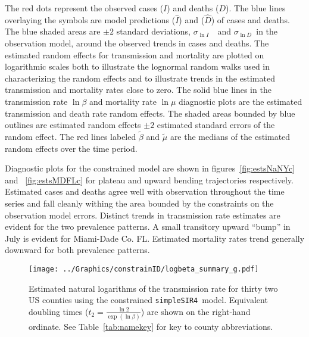 \documentclass[12pt,letterpaper]{article}
\newcommand\SSm{{\tt simpleSIR4}}
\newcommand\slI{$\sigma_{\ln I}$\ }
\newcommand\slD{$\sigma_{\ln D}$}
\begin{document}
\label{pp:diagexpl} 
The red dots represent the observed cases ($I$) and deaths ($D$).
The blue lines overlaying the symbols are model predictions ($\widehat{I}$)
and ($\widehat{D}$) of cases and deaths. 
The blue shaded areas are 
$\pm 2$ standard deviations, \slI\ and \slD\ in the
observation model, around the observed trends in cases and deaths.
The estimated random effects for transmission and mortality are plotted
on logarithmic scales both to illustrate the
lognormal random walks used in characterizing the random effects
and to illustrate trends in the estimated transmission and mortality
rates close to zero.
The solid blue lines in the transmission rate $\ln \beta$ and
mortality rate $\ln \mu$ diagnostic plots are the estimated
transmission and death rate random effects.
The shaded areas bounded by blue outlines are
estimated random effects $\pm 2$ estimated standard errors of the
random effect.
The red lines labeled $\tilde{\beta}$ and $\tilde{\mu}$ are the
medians of the estimated random effects over the time period.

Diagnostic plots for the constrained model are shown in
figures~\ref{fig:estsNaNYc} and~ \ref{fig:estsMDFLc}
for plateau and upward  bending trajectories respectively.
Estimated cases and deaths agree well with observation throughout the
time series and fall cleanly withing the area bounded by the
constraints on the observation model errors.
Distinct trends in transmission rate estimates are evident for
the two prevalence patterns. A small transitory upward ``bump'' in July is
evident for Miami-Dade Co. FL.
Estimated mortality rates trend generally downward  for both
prevalence patterns.

\begin{figure}[!h]
\begin{center}
\texttt{[image: ../Graphics/constrainID/logbeta\_summary\_g.pdf]}\\
\end{center}
\caption{\label{fig:xrates}
Estimated natural logarithms of the transmission rate for thirty two US
counties using the constrained \SSm\ model.
Equivalent doubling times ($t_2 = \frac{\ln 2}{\exp(\ln \beta)}$)
are shown on the right-hand ordinate.
See Table~\ref{tab:namekey} for key to county abbreviations.
}
\end{figure}
\end{document}
